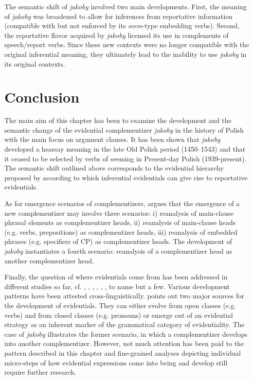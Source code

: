 \documentclass[output=paper
,modfonts
,nonflat]{langsci/langscibook}
\begin{document}
\noindent The semantic shift of \emph{jakoby} involved two main developments. First, the meaning of \emph{jakoby} was broadened to allow for inferences from reportative information (compatible with but not enforced by its \emph{seem}-type embedding verbs). Second, the reportative flavor acquired by \emph{jakoby} licensed its use in complements of speech\slash report verbs. Since these new contexts were no longer compatible with the original inferential meaning, they ultimately lead to the inability to use \emph{jakoby} in its original contexts. 

\section{Conclusion}

The main aim of this chapter has been to examine the development and the semantic change of the evidential complementizer \emph{jakoby} in the history of Polish with the main focus on argument clauses. It has been shown that \emph{jakoby} developed a hearsay meaning in the late Old Polish period (1450--1543) and that it  ceased to be selected by verbs of seeming in Present-day Polish (1939-present). The semantic shift outlined above corresponds to the evidential hierarchy proposed by \textcite{Haan1999} according to which inferential evidentials can give rise to reportative evidentials.     

As for emergence scenarios of complementizers, \textcite[433]{Willis2007} argues that the emergence of a new complementizer may involve three scenarios: i) reanalysis of main-clause phrasal elements as complementizer heads, ii) reanalysis of main-clause heads (e.g. verbs, prepositions) as complementizer heads, iii) reanalysis of embedded phrases (e.g. specifiers of CP) as complementizer heads. The development of \emph{jakoby} instantiates a fourth scenario: reanalysis of a complementizer head as another complementizer head. 

Finally, the question of where evidentials come from has been addressed in different studies so far, cf. \textcite{Willett1988}, \textcite{Lazard2001}, \textcite[271--302]{Aikhenvald2004}, \textcite{Aikhenvald2011}, \textcite{Jalava2017}, \textcite{Friedman2018}, to name but a few. Various development patterns have been attested cross-linguistically. \textcite{Aikhenvald2011} points out two major sources for the development of evidentials. They can either evolve from open classes (e.g. verbs) and from closed classes (e.g. pronouns) or emerge out of an evidential  strategy as an inherent marker of the grammatical category of evidentiality. The case of \emph{jakoby} illustrates the former scenario, in which a complementizer develops into another complementizer. However, not much attention has been paid to the pattern described in this chapter and fine-grained analyses depicting individual micro-steps of how evidential expressions come into being and develop still require further research.      
\end{document}

